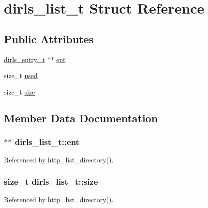\hypertarget{structdirls__list__t}{\section{dirls\-\_\-list\-\_\-t Struct Reference}
\label{structdirls__list__t}
}
\subsection*{Public Attributes}
\begin{DoxyCompactItemize}
\item 
\hyperlink{structdirls__entry__t}{dirls\-\_\-entry\-\_\-t} $\ast$$\ast$ \hyperlink{structdirls__list__t_a54fc25bcfc1c713f3c0eb4d216829641}{ent}
\item 
size\-\_\-t \hyperlink{structdirls__list__t_a58fd06c266713663b03114f7502877f2}{used}
\item 
size\-\_\-t \hyperlink{structdirls__list__t_ad39feccf4a4de4e6a107384dfbfbc1e1}{size}
\end{DoxyCompactItemize}


\subsection{Member Data Documentation}
\hypertarget{structdirls__list__t_a54fc25bcfc1c713f3c0eb4d216829641}{
\subsubsection[{ent}]{$\ast$$\ast$ dirls\-\_\-list\-\_\-t\-::ent}}\label{structdirls__list__t_a54fc25bcfc1c713f3c0eb4d216829641}


Referenced by http\-\_\-list\-\_\-directory().

\hypertarget{structdirls__list__t_ad39feccf4a4de4e6a107384dfbfbc1e1}{
\subsubsection[{size}]{\setlength{\rightskip}{0pt plus 5cm}size\-\_\-t dirls\-\_\-list\-\_\-t\-::size}}\label{structdirls__list__t_ad39feccf4a4de4e6a107384dfbfbc1e1}


Referenced by http\-\_\-list\-\_\-directory().

